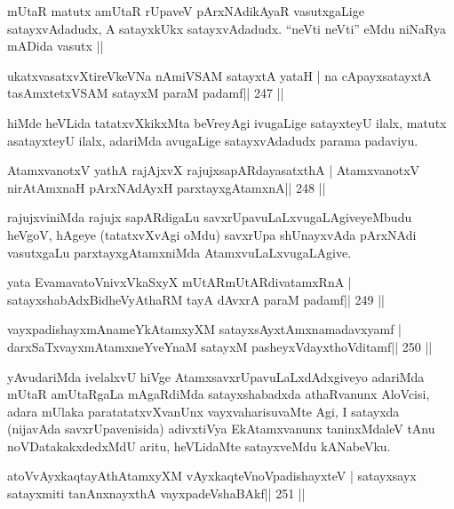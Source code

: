 \begin{artha}
mUtaR matutx amUtaR rUpaveV pArxNAdikAyaR vasutxgaLige satayxvAdadudx,
A satayxkUkx satayxvAdadudx. ``neVti neVti'' eMdu niNaRya mADida vasutx
|| 
\end{artha}


\begin{shl}
ukatxvasatxvXtireVkeVNa nAmiVSAM satayxtA yataH |
na cApayxsatayxtA tasAmxtetxVSAM satayxM paraM padamf\hfill || 247 ||
\end{shl}

\begin{artha}
hiMde heVLida tatatxvXkikxMta beVreyAgi ivugaLige satayxteyU ilalx, matutx asatayxteyU ilalx, adariMda avugaLige satayxvAdadudx parama padaviyu.
\end{artha}

\begin{shl}
AtamxvanotxV yathA rajAjxvX rajujxsapARdayasatxthA |
AtamxvanotxV nirAtAmxnaH pArxNAdAyxH parxtayxgAtamxnA\hfill || 248 ||
\end{shl}

\begin{artha}
rajujxviniMda rajujx sapARdigaLu savxrUpavuLaLxvugaLAgiveyeMbudu  heVgoV, hAgeye (tatatxvXvAgi oMdu) savxrUpa shUnayxvAda pArxNAdi vasutxgaLu parxtayxgAtamxniMda AtamxvuLaLxvugaLAgive.
\end{artha}

\begin{shl}
yata EvamavatoV\s nivxVkaSxyX mUtARmUtARdivatamxRnA |
satayxshabAdxBidheVyAthaRM tayA dAvxrA paraM padamf\hfill || 249 ||
\end{shl}

\begin{shl}
vayxpadishayxmAnameYkAtamxyXM satayxsAyx\s\s tAmxnamadavxyamf |
darxSaTxvayxmAtamxneYveYnaM satayxM pasheyxVdayxthoVditamf\hfill || 250 ||
\end{shl}

\begin{artha}
yAvudariMda ivelalxvU hiVge AtamxsavxrUpavuLaLxdAdxgiveyo adariMda mUtaR amUtaRgaLa mAgaRdiMda satayxshabadxda athaRvanunx AloVcisi, adara mUlaka paratatatxvXvanUnx vayxvaharisuvaMte Agi, I satayxda (nijavAda savxrUpavenisida) adivxtiVya EkAtamxvanunx taninxMdaleV tAnu noVDatakakxdedxMdU aritu, heVLidaMte satayxveMdu kANabeVku.
\end{artha}

\begin{shl}
atoV\s vAyxkaqtayAthAtamxyXM vAyxkaqteVnoVpadishayxteV |
satayxsayx satayxmiti tanAnxnayxthA vayxpadeVshaBAkf\hfill || 251 ||
\end{shl}

